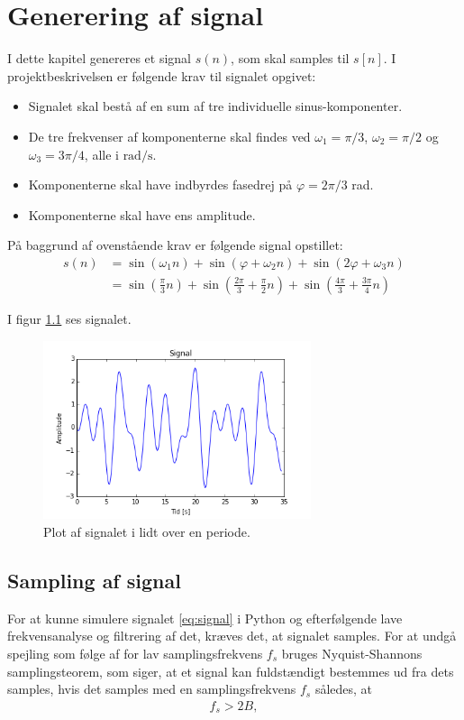 \chapter{Generering af signal}
I dette kapitel genereres et signal $s(n)$, som skal samples til $s[n]$. I projektbeskrivelsen er følgende krav til signalet opgivet:
\begin{itemize}
\setlength\itemsep{0em}
\item Signalet skal bestå af en sum af tre individuelle sinus-komponenter.
\item De tre frekvenser af komponenterne skal findes ved $\omega_1=\pi/3$, $\omega_2=\pi/2$ og $\omega_3=3\pi/4$, alle i $\text{rad}/\text{s}$.
\item Komponenterne skal have indbyrdes fasedrej på $\varphi=2\pi/3$ rad.
\item Komponenterne skal have ens amplitude.
\end{itemize}

På baggrund af ovenstående krav er følgende signal opstillet:
\begin{align} \label{eq:signal}
s(n)&=\sin\left(\omega_1n\right)+\sin\left(\varphi+\omega_2n\right)+\sin\left(2\varphi+\omega_3n\right)\\
&=\sin\left(\frac{\pi}{3}n\right)+\sin\left(\frac{2\pi}{3}+\frac{\pi}{2}n\right)+\sin\left(\frac{4\pi}{3}+\frac{3\pi}{4}n\right)
\end{align}

I figur \ref{fig:signal} ses signalet.
\begin{figure}[H]
\centering
\includegraphics[width=0.7\textwidth]{figures/signal.png}
\caption{Plot af signalet i lidt over en periode.}
\label{fig:signal}
\end{figure}

\section{Sampling af signal}
For at kunne simulere signalet \eqref{eq:signal} i Python og efterfølgende lave frekvensanalyse og filtrering af det, kræves det, at signalet samples. For at undgå spejling som følge af for lav samplingsfrekvens $f_s$ bruges Nyquist-Shannons samplingsteorem, som siger, at et signal kan fuldstændigt bestemmes ud fra dets samples, hvis det samples med en samplingsfrekvens $f_s$ således, at
\begin{align}
f_s > 2B,
\end{align}

